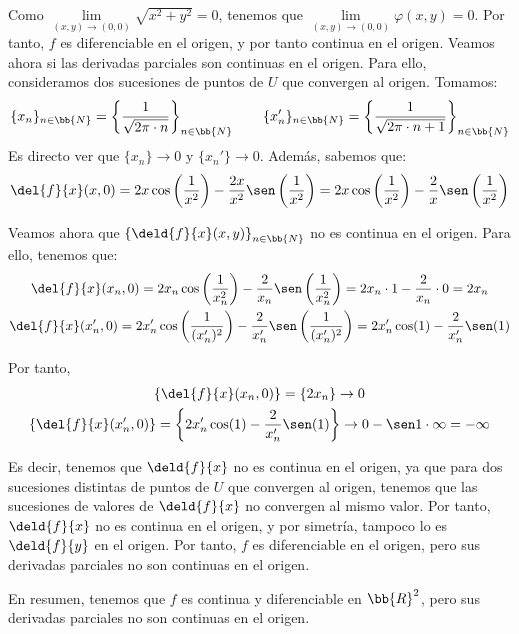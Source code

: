 \begin{ejercicio}
    Como $\lim\limits_{(x,y)\to (0,0)} \sqrt{x^2+y^2} = 0$, tenemos que $\lim\limits_{(x,y)\to (0,0)} \varphi(x,y) = 0$. Por tanto, $f$ es diferenciable en el origen, y por tanto continua en el origen.
    Veamos ahora si las derivadas parciales son continuas en el origen. Para ello, consideramos dos sucesiones de puntos de $U$ que convergen al origen. Tomamos:
    \begin{equation*}
        \{x_n\}_{n\in \bb{N}} = \left\{\frac{1}{\sqrt{2\pi\cdot n}}\right\}_{n\in \bb{N}} \qquad \{x_n'\}_{n\in \bb{N}} = \left\{\frac{1}{\sqrt{2\pi\cdot n + 1}}\right\}_{n\in \bb{N}}
    \end{equation*}
    Es directo ver que $\{x_n\}\to 0$ y $\{x_n'\}\to 0$. Además, sabemos que:
    \begin{equation*}
        \del{f}{x}(x,0) = 2x\cos\left(\frac{1}{x^2}\right) - \frac{2x}{x^2}\sen\left(\frac{1}{x^2}\right) = 2x\cos\left(\frac{1}{x^2}\right) - \frac{2}{x}\sen\left(\frac{1}{x^2}\right)
    \end{equation*}
    
    Veamos ahora que $\left\{\deld{f}{x}(x,y)\right\}_{n\in \bb{N}}$ no es continua en el origen. Para ello, tenemos que:
    \begin{gather*}
        \del{f}{x}(x_n,0) = 2x_n\cos\left(\frac{1}{x_n^2}\right) - \frac{2}{x_n}\sen\left(\frac{1}{x_n^2}\right)
        = 2x_n\cdot 1 - \frac{2}{x_n}\cdot 0 = 2x_n \\
        \del{f}{x}(x_n',0) = 2x_n'\cos\left(\frac{1}{(x_n')^2}\right) - \frac{2}{x_n'}\sen\left(\frac{1}{(x_n')^2}\right)
        = 2x_n' \cos(1) - \frac{2}{x_n'}\sen(1)
    \end{gather*}

    Por tanto,
    \begin{gather*}
        \left\{\del{f}{x}(x_n,0)\right\} =  \left\{2x_n\right\} \to 0 \\
        \left\{\del{f}{x}(x_n',0)\right\} = \left\{2x_n' \cos(1) - \frac{2}{x_n'}\sen(1)\right\} \to 0 - \sen 1 \cdot \infty = -\infty
    \end{gather*}

    Es decir, tenemos que $\deld{f}{x}$ no es continua en el origen, ya que para dos sucesiones distintas de puntos de $U$ que convergen al origen,
    tenemos que las sucesiones de valores de $\deld{f}{x}$ no convergen al mismo valor. Por tanto, $\deld{f}{x}$ no es continua en el origen, y por simetría, tampoco lo es $\deld{f}{y}$ en el origen.
    Por tanto, $f$ es diferenciable en el origen, pero sus derivadas parciales no son continuas en el origen.

    En resumen, tenemos que $f$ es continua y diferenciable en $\bb{R}^2$, pero sus derivadas parciales no son continuas en el origen.
\end{ejercicio}